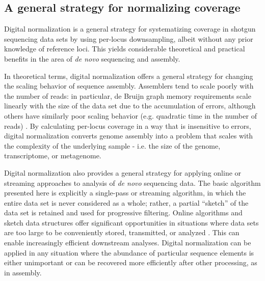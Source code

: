\documentclass[10pt]{article}
\begin{document}



\subsection*{A general strategy for normalizing coverage}

Digital normalization is a general strategy for systematizing coverage
in shotgun sequencing data sets by using per-locus downsampling,
albeit without any prior knowledge of reference loci.  This yields
considerable theoretical and practical benefits in the area of {\em de
  novo} sequencing and assembly.

In theoretical terms, digital normalization offers a general strategy
for changing the scaling behavior of sequence assembly.  Assemblers
tend to scale poorly with the number of reads: in particular, de
Bruijn graph memory requirements scale linearly with the size of the
data set due to the accumulation of errors, although others have
similarly poor scaling behavior (e.g. quadratic time in the number of
reads) \cite{pubmed20211242}.  By calculating per-locus coverage in a way that
is insensitive to errors, digital normalization converts
genome assembly into a problem that scales with the complexity of the
underlying sample - i.e. the size of the genome, transcriptome, or
metagenome.

Digital normalization also provides a general strategy for applying
online or streaming approaches to analysis of {\em de novo} sequencing
data.  The basic algorithm presented here is explicitly a single-pass or streaming
algorithm, in which the entire data set is never considered as a
whole; rather, a partial ``sketch'' of the data set is retained and
used for progressive filtering.  Online algorithms and sketch data
structures offer significant opportunities in situations where data
sets are too large to be conveniently stored, transmitted, or analyzed
\cite{muthukrishnan2005data}.  This can enable increasingly efficient
downstream analyses.
Digital normalization can be applied in any situation where the
abundance of particular sequence elements is either unimportant or can be
recovered more efficiently after other processing, as in assembly.
\end{document}
